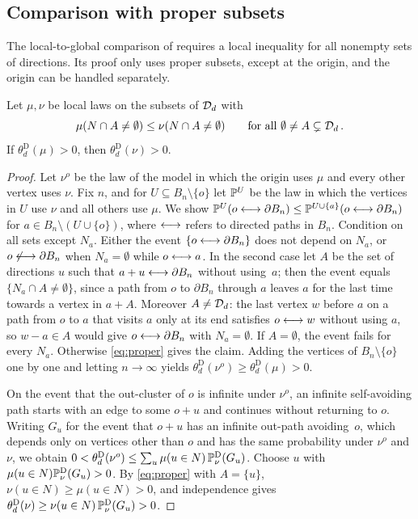 \documentclass[11pt,letterpaper]{article}
\begin{document}
\subsection{Comparison with proper subsets}

The local-to-global comparison of \cite[Theorem~2.1]{BJKLRT25} requires a local inequality for all nonempty sets of directions. Its proof only uses proper subsets, except at the origin, and the origin can be handled separately.

\begin{proposition}\label{prop:proper}
Let $\mu,\nu$ be local laws on the subsets of $\cD_d$ with
\begin{equation}\label{eq:proper}
\mu(N\cap A\ne\emptyset)\le\nu(N\cap A\ne\emptyset)\qquad\text{for all }\emptyset\ne A\subsetneq\cD_d\,.
\end{equation}
If $\theta^{\mathrm D}_d(\mu)>0$, then $\theta^{\mathrm D}_d(\nu)>0$.
\end{proposition}

\begin{proof}
Let $\nu^o$ be the law of the model in which the origin uses $\mu$ and every other vertex uses $\nu$. Fix $n$, and for $U\subseteq B_n\setminus\{o\}$ let $\P^U$ be the law in which the vertices in $U$ use $\nu$ and all others use $\mu$. We show $\P^U(o\lra\partial B_n)\le\P^{U\cup\{a\}}(o\lra\partial B_n)$ for $a\in B_n\setminus(U\cup\{o\})$, where $\lra$ refers to directed paths in $B_n$. Condition on all sets except $N_a$. Either the event $\{o\lra\partial B_n\}$ does not depend on $N_a$, or $o\not\lra\partial B_n$ when $N_a=\emptyset$ while $o\lra a$. In the second case let $A$ be the set of directions $u$ such that $a+u\lra\partial B_n$ without using~$a$; then the event equals $\{N_a\cap A\neq\emptyset\}$, since a path from $o$ to $\partial B_n$ through $a$ leaves $a$ for the last time towards a vertex in $a+A$. Moreover $A\ne\cD_d$: the last vertex $w$ before $a$ on a path from $o$ to $a$ that visits $a$ only at its end satisfies $o\lra w$ without using $a$, so $w-a\in A$ would give $o\lra\partial B_n$ with $N_a=\emptyset$. If $A=\emptyset$, the event fails for every $N_a$. Otherwise \eqref{eq:proper} gives the claim. Adding the vertices of $B_n\setminus\{o\}$ one by one and letting $n\to\infty$ yields $\theta^{\mathrm D}_d(\nu^o)\ge\theta^{\mathrm D}_d(\mu)>0$.

On the event that the out-cluster of $o$ is infinite under $\nu^o$, an infinite self-avoiding path starts with an edge to some $o+u$ and continues without returning to $o$. Writing $G_u$ for the event that $o+u$ has an infinite out-path avoiding~$o$, which depends only on vertices other than $o$ and has the same probability under $\nu^o$ and $\nu$, we obtain $0<\theta^{\mathrm D}_d(\nu^o)\le\sum_u\mu(u\in N)\,\P^{\mathrm D}_\nu(G_u)$. Choose $u$ with $\mu(u\in N)\P^{\mathrm D}_\nu(G_u)>0$. By \eqref{eq:proper} with $A=\{u\}$, $\nu(u\in N)\ge\mu(u\in N)>0$, and independence gives $\theta^{\mathrm D}_d(\nu)\ge\nu(u\in N)\,\P^{\mathrm D}_\nu(G_u)>0$.
\end{proof}
\end{document}
